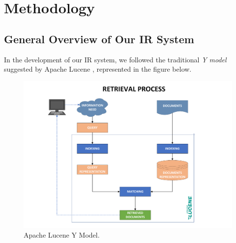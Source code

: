\section{Methodology}
\label{sec:methodology}

\subsection{General Overview of Our IR System}
In the development of our \ac{IR} system, we followed the traditional \textit{Y model} suggested by Apache Lucene \cite{lucene}, represented in the figure below.

\begin{figure}[!h]
    \centering
    \includegraphics[width=0.9\linewidth]{figure/Y.pdf}
    \caption{Apache Lucene Y Model.}
    \label{fig:lucene_yModel}
\end{figure}

